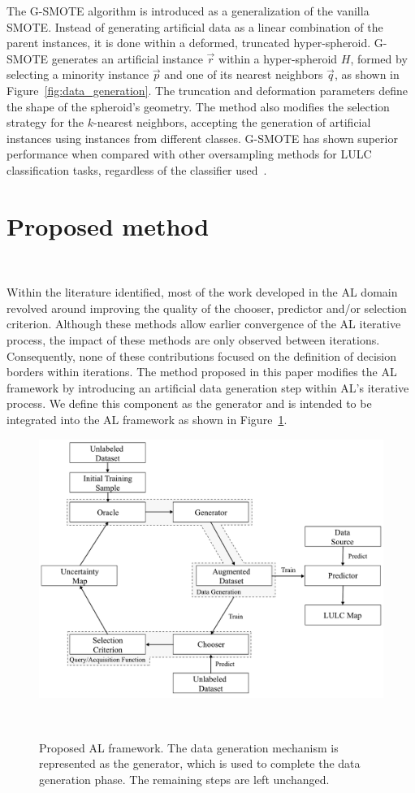 \documentclass[preprint,12pt]{elsarticle}
\begin{document}
The G-SMOTE algorithm is introduced as a generalization of the vanilla
SMOTE\@.  Instead of generating artificial data as a linear combination of the
parent instances, it is done within a deformed, truncated hyper-spheroid.
G-SMOTE generates an artificial instance $\overrightarrow{r}$ within a
hyper-spheroid $H$, formed by selecting a minority instance
$\overrightarrow{p}$ and one of its nearest neighbors $\overrightarrow{q}$, as
shown in Figure~\ref{fig:data_generation}. The truncation and deformation
parameters define the shape of the spheroid's geometry. The method also
modifies the selection strategy for the $k$-nearest neighbors, accepting the
generation of artificial instances using instances from different classes.
G-SMOTE has shown superior performance when compared with other oversampling
methods for LULC classification tasks, regardless of the classifier
used~\cite{Douzas2019class}.

\section{Proposed method}~\label{sec:proposed-method}

Within the literature identified, most of the work developed in the AL domain
revolved around improving the quality of the chooser, predictor and/or
selection criterion. Although these methods allow earlier convergence of the AL
iterative process, the impact of these methods are only observed between
iterations. Consequently, none of these contributions focused on the
definition of decision borders within iterations. The method proposed in this
paper modifies the AL framework by introducing an artificial data generation
step within AL's iterative process. We define this component as the generator
and is intended to be integrated into the AL framework as shown in
Figure~\ref{fig:al_new}. 

\begin{figure}[htb]
	\centering
	\includegraphics[width=\linewidth]{../analysis/al_new}
    \caption{Proposed AL framework. The data generation mechanism is
        represented as the generator, which is used to complete the data
        generation phase. The remaining steps are left unchanged.
    }~\label{fig:al_new}
\end{figure}
\end{document}
